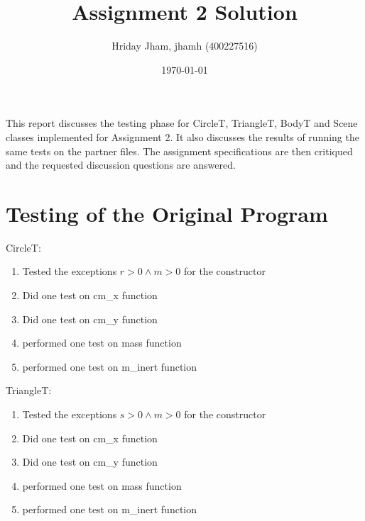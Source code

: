 \documentclass[12pt]{article}
\title{Assignment 2 Solution}
\author{Hriday Jham, jhamh (400227516)}
\date{\today}
\begin{document}
\maketitle

This report discusses the testing phase for CircleT, TriangleT, BodyT and Scene classes implemented for Assignment 2. It also discusses the results
of running the same tests on the partner files. The assignment specifications
are then critiqued and the requested discussion questions are answered.

\section{Testing of the Original Program}

CircleT:
\begin{enumerate}
    \item Tested the exceptions $r > 0 \land m > 0$ for the constructor
    
    \item Did one test on cm\_x function
    
    \item Did one test on cm\_y function
    
    \item performed one test on mass function
    
    \item performed one test on m\_inert function\\
    
\end{enumerate}

\noindent TriangleT:
\begin{enumerate}
    \item Tested the exceptions $s > 0 \land m > 0$ for the constructor
    
    \item Did one test on cm\_x function
    
    \item Did one test on cm\_y function
    
    \item performed one test on mass function
    
    \item performed one test on m\_inert function\\
    
\end{enumerate}
\end{document}
